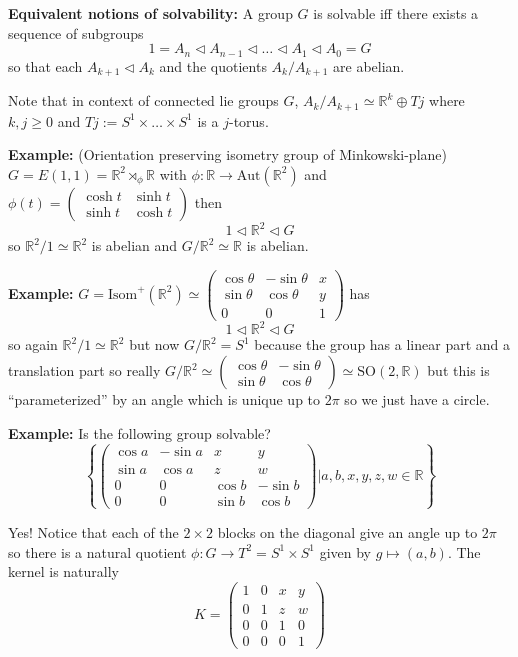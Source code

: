 \documentclass[12pt]{article}
\newcommand{\R}{\mathbb{R}}
\newcommand{\SO}{\text{SO}}
\newcommand{\Aut}{\text{Aut}}
\newcommand{\Isom}{\text{Isom}}
\begin{document}
    \textbf{Equivalent notions of solvability:} A group $G$ is solvable iff there exists a sequence of subgroups 
    \[1 = A_n \triangleleft A_{n-1} \triangleleft \dots \triangleleft A_1 \triangleleft A_0 = G\]
    so that each $A_{k+1} \triangleleft A_k$ and the quotients $A_k/A_{k+1}$ are abelian.

    Note that in context of connected lie groups $G$, $A_k/A_{k+1} \simeq \R^k \oplus Tj$ where $k, j \geq 0$ and $Tj:= S^1 \times \dots \times S^1$ is a $j$-torus.

    \textbf{Example:} (Orientation preserving isometry group of Minkowski-plane) $G = E(1, 1) = \R^2 \rtimes_{\phi} \R$ with $\phi: \R \to \Aut(\R^2)$ and $\phi(t) = \begin{pmatrix}
        \cosh t & \sinh t\\ 
        \sinh t & \cosh t
    \end{pmatrix}$ then 
    \[1 \triangleleft \R^2 \triangleleft G\]
    so $\R^2/1 \simeq \R^2$ is abelian and $G/\R^2 \simeq \R$ is abelian.

    \textbf{Example:} $G = \Isom^+(\R^2) \simeq \begin{pmatrix}
        \cos \theta & -\sin \theta & x\\ 
        \sin \theta & \cos \theta & y\\
        0 & 0 & 1
    \end{pmatrix}$ has 
    \[1 \triangleleft \R^2 \triangleleft G\] 
    so again $\R^2/1 \simeq \R^2$ but now $G/\R^2 = S^1$ because the group has a linear part and a translation part so really $G/\R^2 \simeq \begin{pmatrix}
        \cos \theta & -\sin \theta\\ 
        \sin \theta & \cos \theta
    \end{pmatrix} \simeq \SO(2, \R)$ but this is ``parameterized'' by an angle which is unique up to $2\pi$ so we just have a circle. 

    \textbf{Example:} Is the following group solvable? 
    \[\left\{\begin{pmatrix}
        \cos a & -\sin a & x & y\\ 
        \sin a & \cos a & z & w\\ 
        0 & 0 & \cos b & -\sin b\\ 
        0 & 0 & \sin b & \cos b
    \end{pmatrix} \bigg\vert a, b,x, y, z, w \in \R\right\}\]

    Yes! Notice that each of the $2\times 2$ blocks on the diagonal give an angle up to $2\pi$ so there is a natural quotient $\phi: G \to T^2 = S^1 \times S^1$ given by $g \mapsto (a, b)$. The kernel is naturally 
    \[K = \begin{pmatrix}
        1 & 0 & x & y\\ 
        0 & 1 & z & w\\
        0 & 0 & 1 & 0\\
        0 & 0 & 0 & 1
    \end{pmatrix}\]
\end{document}
